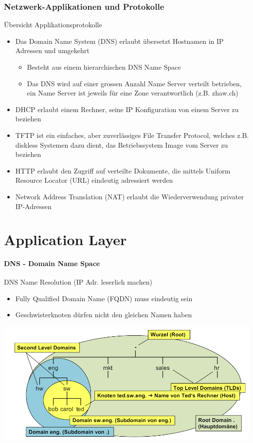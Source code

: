 

\subsubsection*{Netzwerk-Applikationen und Protokolle}

\begin{KR}{Übersicht Applikationsprotokolle}
    \begin{itemize}
        \item Das Domain Name System (DNS) erlaubt übersetzt Hostnamen in IP Adressen und umgekehrt
        \begin{itemize}
            \item Besteht aus einem hierarchischen DNS Name Space
            \item Das DNS wird auf einer grossen Anzahl Name Server verteilt betrieben, ein Name Server ist jeweils für eine Zone verantwortlich (z.B. zhaw.ch)
        \end{itemize}
        \item DHCP erlaubt einem Rechner, seine IP Konfiguration von einem Server zu beziehen
        \item TFTP ist ein einfaches, aber zuverlässiges File Transfer Protocol, welches z.B. diskless Systemen dazu dient, das Betriebssystem Image vom Server zu beziehen
        \item HTTP erlaubt den Zugriff auf verteilte Dokumente, die mittels Uniform Resource Locator (URL) eindeutig adressiert werden
        \item Network Address Translation (NAT) erlaubt die Wiederverwendung privater IP-Adressen
    \end{itemize}
\end{KR}

\section{Application Layer}

\paragraph{DNS - Domain Name Space}

\begin{definition}{DNS} Name Resolution (IP Adr. leserlich machen)
    \begin{itemize}
        \item Fully Qualified Domain Name (FQDN) muss eindeutig sein
        \item Geschwisterknoten dürfen nicht den gleichen Namen haben
    \end{itemize}
    \includegraphics[width=0.8\linewidth]{images/dns_explained.png}
\end{definition}


